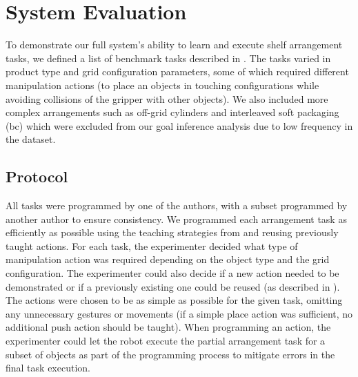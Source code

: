 \section{System Evaluation}\label{sec:irossystemeval}

To demonstrate our full system's ability to learn and execute shelf arrangement tasks, we defined a list of benchmark tasks described in . 
The tasks varied in product type and grid configuration parameters, some of which required different manipulation actions (\eg to place an objects in touching configurations while avoiding collisions of the gripper with other objects).
We also included more complex arrangements such as off-grid cylinders and interleaved soft packaging (bc) which were excluded from our goal inference analysis due to low frequency in the dataset. 

\subsection{Protocol}
All tasks were programmed by one of the authors, with a subset programmed by another author to ensure consistency.
We programmed each arrangement task as efficiently as possible using the teaching strategies from  and reusing previously taught actions. 
For each task, the experimenter decided what type of manipulation action was required depending on the object type and the grid configuration.
The experimenter could also decide if a new action needed to be demonstrated or if a previously existing one could be reused (as described in ).
The actions were chosen to be as simple as possible for the given task, omitting any unnecessary gestures or movements (\eg if a simple place action was sufficient, no additional push action should be taught). When programming an action, the experimenter could let the robot execute the partial arrangement task for a subset of objects as part of the programming process to mitigate errors in the final task execution.

